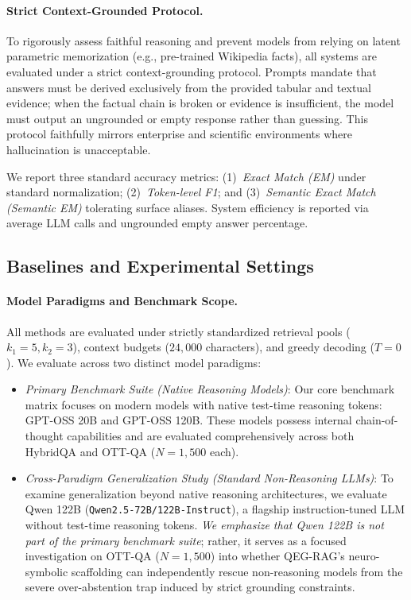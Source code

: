 \documentclass[runningheads]{llncs}
\begin{document}
\paragraph{Strict Context-Grounded Protocol.}
To rigorously assess faithful reasoning and prevent models from relying on latent parametric memorization (e.g., pre-trained Wikipedia facts), all systems are evaluated under a strict context-grounding protocol. Prompts mandate that answers must be derived exclusively from the provided tabular and textual evidence; when the factual chain is broken or evidence is insufficient, the model must output an ungrounded or empty response rather than guessing. This protocol faithfully mirrors enterprise and scientific environments where hallucination is unacceptable.

We report three standard accuracy metrics: (1)~\emph{Exact Match (EM)} under standard normalization; (2)~\emph{Token-level F1}; and (3)~\emph{Semantic Exact Match (Semantic EM)} tolerating surface aliases. System efficiency is reported via average LLM calls and ungrounded empty answer percentage.

\enlargethispage{4.5\baselineskip}
\subsection{Baselines and Experimental Settings}
\paragraph{Model Paradigms and Benchmark Scope.}
All methods are evaluated under strictly standardized retrieval pools ($k_1=5, k_2=3$), context budgets ($24{,}000$ characters), and greedy decoding ($T=0$). We evaluate across two distinct model paradigms:
\begin{itemize}[leftmargin=1.5em]
    \item \emph{Primary Benchmark Suite (Native Reasoning Models)}: Our core benchmark matrix focuses on modern models with native test-time reasoning tokens: GPT-OSS 20B and GPT-OSS 120B. These models possess internal chain-of-thought capabilities and are evaluated comprehensively across both HybridQA and OTT-QA ($N=1{,}500$ each).
    \item \emph{Cross-Paradigm Generalization Study (Standard Non-Reasoning LLMs)}: To examine generalization beyond native reasoning architectures, we evaluate Qwen 122B (\texttt{Qwen2.5-72B/122B-Instruct}), a flagship instruction-tuned LLM without test-time reasoning tokens. \emph{We emphasize that Qwen 122B is not part of the primary benchmark suite}; rather, it serves as a focused investigation on OTT-QA ($N=1{,}500$) into whether QEG-RAG's neuro-symbolic scaffolding can independently rescue non-reasoning models from the severe over-abstention trap induced by strict grounding constraints.
\end{itemize}
\end{document}
